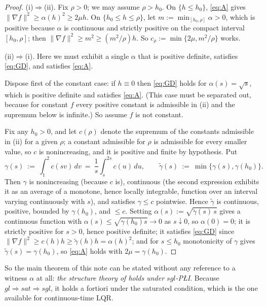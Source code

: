 \documentclass[11pt]{article}
\theoremstyle{plain}
\theoremstyle{definition}
\theoremstyle{remark}
\begin{document}
\begin{proof}
(i)$\Rightarrow$(ii). Fix $\rho>0$; we may assume $\rho>h_0$. On $\{h\le h_0\}$,
\eqref{eq:A} gives $\|\nabla f\|^2\ge\alpha(h)^2\ge 2\mu h$. On
$\{h_0\le h\le\rho\}$, let $m:=\min_{[h_0,\rho]}\alpha>0$, which is positive
because $\alpha$ is continuous and strictly positive on the compact interval
$[h_0,\rho]$; then $\|\nabla f\|^2\ge m^2\ge (m^2/\rho)h$. So
$c_\rho:=\min\{2\mu, m^2/\rho\}$ works.

(ii)$\Rightarrow$(i). Here we must exhibit a single $\alpha$ that is positive
definite, satisfies \eqref{eq:GD}, and satisfies \eqref{eq:A}.

Dispose first of the constant case: if $h\equiv0$ then \eqref{eq:GD} holds for
$\alpha(s)=\sqrt s$, which is positive definite and satisfies \eqref{eq:A}. (This
case must be separated out, because for constant $f$ every positive constant is
admissible in (ii) and the supremum below is infinite.) So assume $f$ is not
constant.

Fix any $h_0>0$, and let $c(\rho)$ denote the supremum of the constants
admissible in (ii) for a given $\rho$; a constant admissible for $\rho$ is
admissible for every smaller value, so $c$ is nonincreasing, and it is positive
and finite by hypothesis. Put
\[
  \gamma(s) \ :=\ \int_1^2 c(sv)\,dv \ =\ \frac1s\int_s^{2s} c(u)\,du , \qquad
  \tilde\gamma(s) \ :=\ \min\{\gamma(s), \gamma(h_0)\} .
\]
Then $\gamma$ is nonincreasing (because $c$ is), continuous (the second
expression exhibits it as an average of a monotone, hence locally integrable,
function over an interval varying continuously with $s$), and satisfies
$\gamma\le c$ pointwise. Hence $\tilde\gamma$ is continuous, positive, bounded by
$\gamma(h_0)$, and $\le c$. Setting
$\alpha(s):=\sqrt{\tilde\gamma(s)\,s}$ gives a continuous function with
$\alpha(s)\le\sqrt{\gamma(h_0)s}\to0$ as $s\downarrow0$, so $\alpha(0)=0$; it is
strictly positive for $s>0$, hence positive definite; it satisfies \eqref{eq:GD}
since $\|\nabla f\|^2\ge c(h)h\ge\tilde\gamma(h)h=\alpha(h)^2$; and for
$s\le h_0$ monotonicity of $\gamma$ gives $\tilde\gamma(s)=\gamma(h_0)$, so
\eqref{eq:A} holds with $2\mu=\gamma(h_0)$.
\end{proof}

So the main theorem of this note can be stated without any reference to a witness
$\alpha$ at all: \emph{the structure theory of \cite{BCR2026} holds under
$sgl$-P\L{}I}. Because $gl \Rightarrow sat \Rightarrow sgl$, it holds a fortiori
under the saturated condition, which is the one available for continuous-time
LQR.
\end{document}
